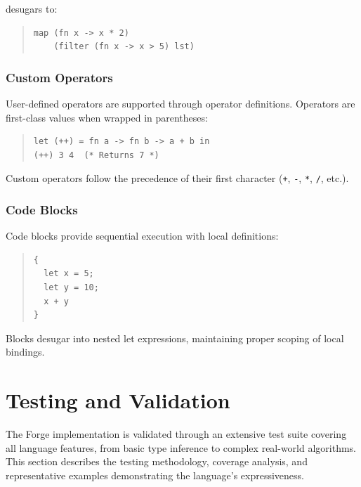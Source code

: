 \documentclass[conference,onecolumn]{IEEEtran}
\begin{document}
desugars to:

\begin{quote}
\small
\begin{verbatim}
map (fn x -> x * 2) 
    (filter (fn x -> x > 5) lst)
\end{verbatim}
\end{quote}

\subsubsection{Custom Operators}

User-defined operators are supported through operator definitions. Operators are first-class values when wrapped in parentheses:

\begin{quote}
\small
\begin{verbatim}
let (++) = fn a -> fn b -> a + b in
(++) 3 4  (* Returns 7 *)
\end{verbatim}
\end{quote}

Custom operators follow the precedence of their first character (\texttt{+}, \texttt{-}, \texttt{*}, \texttt{/}, etc.).

\subsubsection{Code Blocks}

Code blocks provide sequential execution with local definitions:

\begin{quote}
\small
\begin{verbatim}
{
  let x = 5;
  let y = 10;
  x + y
}
\end{verbatim}
\end{quote}

Blocks desugar into nested let expressions, maintaining proper scoping of local bindings.

\newpage
\section{Testing and Validation}

The Forge implementation is validated through an extensive test suite covering all language features, from basic type inference to complex real-world algorithms. This section describes the testing methodology, coverage analysis, and representative examples demonstrating the language's expressiveness.
\end{document}
